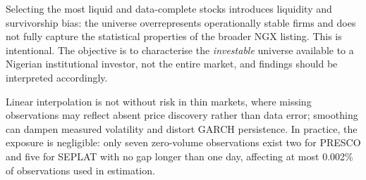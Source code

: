 \documentclass[twoside,11pt]{article}
\begin{document}
	Selecting the most liquid and data-complete stocks introduces liquidity and survivorship bias: the universe overrepresents operationally stable firms and does not fully capture the statistical properties of the broader NGX listing. This is intentional. The objective is to characterise the \emph{investable} universe available to a Nigerian institutional investor, not the entire market, and findings should be interpreted accordingly.
	
	Linear interpolation is not without risk in thin markets, where missing observations may reflect absent price discovery rather than data error; smoothing can dampen measured volatility and distort GARCH persistence. In practice, the exposure is negligible: only seven zero-volume observations exist two for PRESCO and five for SEPLAT with no gap longer than one day, affecting at most 0.002\% of observations used in estimation.
	
\end{document}

